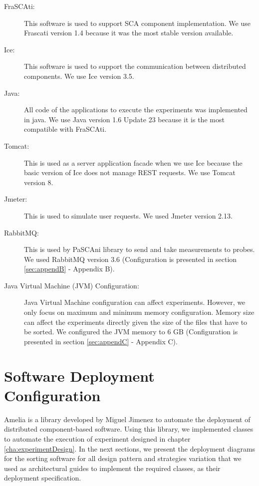 \begin{description}
	\item [FraSCAti:] This software is used to support SCA component implementation. We use Frascati version 1.4 because it was the most stable version available.
	\item [Ice:] This software is used to support the communication between distributed components. We use Ice version 3.5.
	\item [Java:] All code of the applications to execute the experiments was implemented in java. We use Java version 1.6 Update 23 because it is the most compatible with FraSCAti.
	\item [Tomcat:] This is used as a server application facade when we use Ice because the basic version of Ice does not manage REST requests. We use Tomcat version 8.
	\item [Jmeter:] This is used to simulate user requests. We used Jmeter version 2.13.
	\item [RabbitMQ:] This is used by PaSCAni library to send and take measurements to probes.  We used RabbitMQ version 3.6 (Configuration is presented in section \ref{sec:appendB} - Appendix B).
	\item [Java Virtual Machine (JVM) Configuration:] Java Virtual Machine configuration can affect experiments. However, we only focus on maximum and minimum memory configuration. Memory size can affect the experiments directly given the size of the files that have to be sorted. We configured the JVM memory to 6 GB (Configuration is presented in section \ref{sec:appendC} - Appendix C).
	
\end{description}


\section{Software Deployment Configuration}
Amelia is a library developed by Miguel Jimenez \cite{AmeliaMiguelJimenez} to automate the deployment of distributed component-based software. Using this library, we implemented classes to automate the execution of experiment designed in chapter \ref{cha:experimentDesign}. In the next sections, we present the deployment diagrams for the sorting software for all design pattern and strategies variation that we used as architectural guides to implement the required classes, as their deployment specification.

